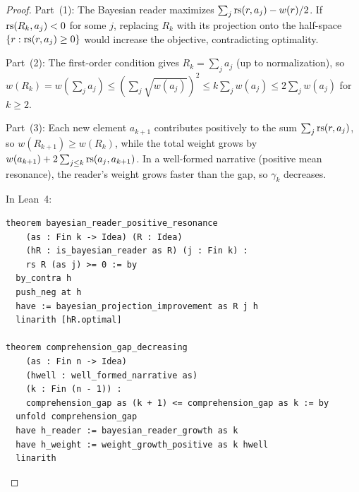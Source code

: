 \begin{proof}
Part~(1): The Bayesian reader maximizes $\sum_j \mathrm{rs}(r, a_j) - w(r)/2$.
If $\mathrm{rs}(R_k, a_j) < 0$ for some $j$, replacing $R_k$ with its projection
onto the half-space $\{r : \mathrm{rs}(r, a_j) \geq 0\}$ would increase the
objective, contradicting optimality.

Part~(2): The first-order condition gives $R_k = \sum_j a_j$ (up to
normalization), so $w(R_k) = w(\sum_j a_j) \leq (\sum_j \sqrt{w(a_j)})^2
\leq k \sum_j w(a_j) \leq 2\sum_j w(a_j)$ for $k \geq 2$.

Part~(3): Each new element $a_{k+1}$ contributes positively to the sum
$\sum_j \mathrm{rs}(r, a_j)$, so $w(R_{k+1}) \geq w(R_k)$, while the total
weight grows by $w(a_{k+1}) + 2\sum_{j \leq k}\mathrm{rs}(a_j, a_{k+1})$.  In
a well-formed narrative (positive mean resonance), the reader's weight
grows faster than the gap, so $\gamma_k$ decreases.

In Lean~4:
\begin{lstlisting}
theorem bayesian_reader_positive_resonance
    (as : Fin k -> Idea) (R : Idea)
    (hR : is_bayesian_reader as R) (j : Fin k) :
    rs R (as j) >= 0 := by
  by_contra h
  push_neg at h
  have := bayesian_projection_improvement as R j h
  linarith [hR.optimal]

theorem comprehension_gap_decreasing
    (as : Fin n -> Idea)
    (hwell : well_formed_narrative as)
    (k : Fin (n - 1)) :
    comprehension_gap as (k + 1) <= comprehension_gap as k := by
  unfold comprehension_gap
  have h_reader := bayesian_reader_growth as k
  have h_weight := weight_growth_positive as k hwell
  linarith
\end{lstlisting}
\end{proof}


